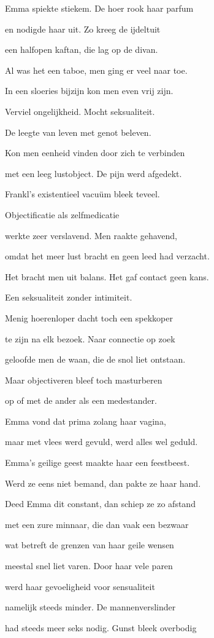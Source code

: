Emma spiekte stiekem.
De hoer rook haar parfum

en nodigde haar uit.
Zo kreeg de ijdeltuit

een halfopen kaftan,
die lag op de divan.

Al was het een taboe,
men ging er veel naar toe.

In een sloeries bijzijn
kon men even vrij zijn.

Verviel ongelijkheid.
Mocht seksualiteit.

De leegte van leven
met genot beleven.

Kon men eenheid vinden
door zich te verbinden

met een leeg lustobject.
De pijn werd afgedekt.

Frankl’s existentieel
vacuüm bleek teveel.

Objectificatie
als zelfmedicatie

werkte zeer verslavend.
Men raakte gehavend,

omdat het meer lust bracht
en geen leed had verzacht.

Het bracht men uit balans.
Het gaf contact geen kans.

Een seksualiteit
zonder intimiteit.

Menig hoerenloper
dacht toch een spekkoper

te zijn na elk bezoek.
Naar connectie op zoek

geloofde men de waan,
die de snol liet ontstaan.

Maar objectiveren
bleef toch masturberen

op of met de ander
als een medestander.

Emma vond dat prima
zolang haar vagina,

maar met vlees werd gevuld,
werd alles wel geduld.

Emma’s geilige geest
maakte haar een feestbeest.

Werd ze eens niet bemand,
dan pakte ze haar hand.

Deed Emma dit constant,
dan schiep ze zo afstand

met een zure minnaar,
die dan vaak een bezwaar

wat betreft de grenzen
van haar geile wensen

meestal snel liet varen.
Door haar vele paren

werd haar gevoeligheid
voor sensualiteit

namelijk steeds minder.
De mannenverslinder

had steeds meer seks nodig.
Gunst bleek overbodig

